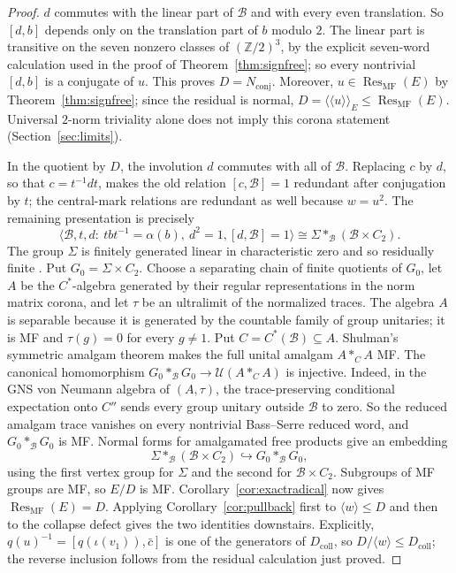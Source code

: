 \documentclass[11pt]{amsart}
\theoremstyle{definition}
\theoremstyle{remark}
\theoremstyle{plain}
\newcommand{\U}{\mathcal U}
\begin{document}
\begin{proof}
$d$ commutes with the linear part of $\mathcal B$ and with every
even translation.  So $[d,b]$ depends only on the translation part of
$b$ modulo $2$.  The linear part is transitive on the seven nonzero classes
of $(\mathbb Z/2)^3$, by the explicit seven-word calculation used in the
proof of Theorem~\ref{thm:signfree}; so every nontrivial $[d,b]$ is a
conjugate of $u$.  This proves $D=N_{\mathrm{conj}}$.  Moreover,
$u\in\operatorname{Res}_{\mathrm{MF}}(E)$ by
Theorem~\ref{thm:signfree}; since the residual is normal,
$D=\langle\!\langle u\rangle\!\rangle_E
\le\operatorname{Res}_{\mathrm{MF}}(E)$.  Universal $2$-norm triviality
alone does not imply this corona statement (Section~\ref{sec:limits}).

In the quotient by $D$, the involution $d$ commutes with all of
$\mathcal B$.  Replacing $c$ by $d$, so that $c=t^{-1}dt$, makes the old
relation $[c,\mathcal B]=1$ redundant after conjugation by $t$; the
central-mark relations are redundant as well because $w=u^2$.  The remaining
presentation is precisely
\[
 \langle\mathcal B,t,d:\ tbt^{-1}=\alpha(b),\ d^2=1,
 [d,\mathcal B]=1\rangle
 \cong \Sigma*_{\mathcal B}(\mathcal B\times C_2).
\]
The group $\Sigma$ is finitely generated linear in characteristic zero and
so residually finite \cite{Malcev}.  Put $G_0=\Sigma\times C_2$.  Choose a
separating chain of finite quotients of $G_0$, let $A$ be the $C^*$-algebra
generated by their regular representations in the norm matrix corona, and let
$\tau$ be an ultralimit of the normalized traces.  The algebra $A$ is
separable because it is generated by the countable family of group unitaries;
it is MF and
$\tau(g)=0$ for every $g\ne1$.  Put $C=C^*(\mathcal B)\subseteq A$.
Shulman's symmetric amalgam theorem \cite[Theorem~10]{Shulman} makes
the full unital amalgam $A*_{C}A$ MF\@.  The canonical homomorphism
$G_0*_{\mathcal B}G_0\to\U(A*_{C}A)$ is injective.  Indeed, in the GNS von
Neumann algebra of $(A,\tau)$, the trace-preserving conditional expectation
onto $C''$ sends every group unitary outside $\mathcal B$ to zero.  So the
reduced amalgam trace vanishes on every nontrivial Bass--Serre reduced
word, and $G_0*_{\mathcal B}G_0$ is MF\@.  Normal forms for amalgamated free products give
an embedding
\[
 \Sigma*_{\mathcal B}(\mathcal B\times C_2)
 \hookrightarrow G_0*_{\mathcal B}G_0,
\]
using the first vertex group for $\Sigma$ and the second for
$\mathcal B\times C_2$.  Subgroups of MF groups are MF, so $E/D$ is MF\@.
Corollary~\ref{cor:exactradical} now gives
$\operatorname{Res}_{\mathrm{MF}}(E)=D$.  Applying
Corollary~\ref{cor:pullback} first to $\langle w\rangle\le D$ and then to
the collapse defect gives the two identities downstairs.  Explicitly,
$q(u)^{-1}=[q(\iota(v_1)),\bar c]$ is one of the generators of
$D_{\mathrm{coll}}$, so $D/\langle w\rangle\le D_{\mathrm{coll}}$; the
reverse inclusion follows from the residual calculation just proved.
\end{proof}
\end{document}
